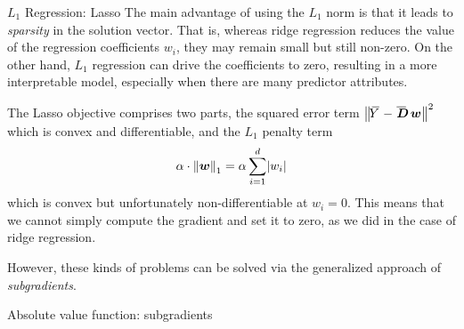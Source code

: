 \begin{frame}{$L_1$ Regression: Lasso}
The main advantage of using the $L_1$ norm is that it leads to {\em
sparsity} in the solution vector. That is, whereas ridge regression
reduces the value of the regression coefficients $w_i$, they may remain
small but still non-zero. On the other hand, $L_1$ regression can drive
the coefficients to zero, resulting in a more interpretable model,
especially when there are many predictor attributes.

\medskip

The Lasso objective comprises two parts, the squared error term
$\norm{\mY-\mbD\;\bw}^2$ which is convex and differentiable, and the $L_1$
penalty term 
$$\alpha \cdot \left\lVert{\boldsymbol w}\right\rVert_1 = \alpha \sum^{d}_{i=1} \lvert w_i\rvert$$ 
which is convex but unfortunately non-differentiable at $w_i
= 0$. This means that we cannot simply compute the gradient and set it
to zero, as we did in the case of ridge regression.

\medskip

However, these kinds of problems can be solved via the generalized
approach of {\em subgradients}.
\end{frame}
%
%
\begin{frame}{Absolute value function: subgradients}
    \centering
\end{frame}
